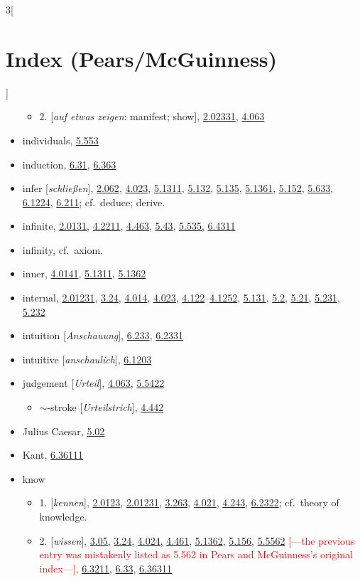 \documentclass[oneside,openany,12pt]{book}
\newcommand{\indexentry}[1]{\item #1}
\newcommand{\indexsubentry}[1]{\begin{itemize} \item #1 \end{itemize}}
\newcommand{\indexref}[1]{\hyperlink{prop#1}{#1}}
\newcommand{\indexgap}{\bigskip}
\newcommand{\kckaddition}[1]{\textcolor{red}{#1}}
\begin{document}
\begin{multicols}{3}[\section*{Index (Pears/McGuinness)}]
\begin{itemize}
   \indexsubentry{2. [\textit{auf etwas zeigen}: manifest; show], \indexref{2.02331}, \indexref{4.063}}

\indexentry{individuals, \indexref{5.553}}

\indexentry{induction, \indexref{6.31}, \indexref{6.363}}

\indexentry{infer [\textit{schlie{\ss}en}], \indexref{2.062}, \indexref{4.023}, \indexref{5.1311}, \indexref{5.132}, \indexref{5.135}, \indexref{5.1361}, \indexref{5.152}, \indexref{5.633}, \indexref{6.1224}, \indexref{6.211}; cf.\ deduce; derive.}

\indexentry{infinite, \indexref{2.0131}, \indexref{4.2211}, \indexref{4.463}, \indexref{5.43}, \indexref{5.535}, \indexref{6.4311}}

\indexentry{infinity, cf.\ axiom.}

\indexentry{inner, \indexref{4.0141}, \indexref{5.1311}, \indexref{5.1362}}

\indexentry{internal, \indexref{2.01231}, \indexref{3.24}, \indexref{4.014}, \indexref{4.023}, \indexref{4.122}--\indexref{4.1252}, \indexref{5.131}, \indexref{5.2}, \indexref{5.21}, \indexref{5.231}, \indexref{5.232}}

\indexentry{intuition [\textit{Anschauung}], \indexref{6.233}, \indexref{6.2331}}

\indexentry{intuitive [\textit{anschaulich}], \indexref{6.1203}}

\indexgap

\indexentry{judgement [\textit{Urteil}], \indexref{4.063}, \indexref{5.5422}}

   \indexsubentry{$\sim$-stroke [\textit{Urteilstrich}], \indexref{4.442}}

\indexentry{Julius Caesar, \indexref{5.02}}

\indexgap

\indexentry{Kant, \indexref{6.36111}}

\indexentry{know}

   \indexsubentry{1. [\textit{kennen}], \indexref{2.0123}, \indexref{2.01231}, \indexref{3.263}, \indexref{4.021}, \indexref{4.243}, \indexref{6.2322}; cf.\ theory of knowledge.}

   \indexsubentry{2. [\textit{wissen}], \indexref{3.05}, \indexref{3.24}, \indexref{4.024}, \indexref{4.461}, \indexref{5.1362}, \indexref{5.156}, \indexref{5.5562} \kckaddition{[---the previous entry was mistakenly listed as 5.562 in Pears and McGuinness's original index---]}, \indexref{6.3211}, \indexref{6.33}, \indexref{6.36311}}


\end{itemize}
\end{multicols}
\end{document}
